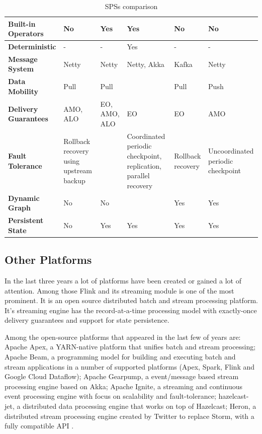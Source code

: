 \documentclass[ppgc,diss,english]{iiufrgs}
\begin{document}
\begin{table}[t]
\begin{center}
\begin{tabular}{ | p{2.5cm} | p{2cm} | p{2.5cm} | p{2.5cm} | p{2cm} | p{2cm} |}
        \textbf{Built-in Operators}      & No & Yes & Yes & No & No \\\hline
        \textbf{Deterministic}           & - & - & Yes & - & - \\\hline
        
        \textbf{Message System}          & Netty & Netty & Netty, Akka & Kafka & Netty \\\hline
        \textbf{Data Mobility}\cite{kamburugamuvesurvey}          & Pull & Pull &  & Pull & Push \\\hline
        \textbf{Delivery Guarantees}\cite{bockermann2014survey}    & AMO, ALO & EO, AMO, ALO & EO & EO & AMO \\\hline
        \textbf{Fault Tolerance}\cite{gradvohl2014comparing}         & Rollback recovery using upstream backup &  & Coordinated periodic checkpoint, replication, parallel recovery & Rollback recovery \cite{kamburugamuvesurvey}  & Uncoordinated periodic checkpoint \\\hline
        \textbf{Dynamic Graph}           & No & No &  & Yes & Yes \\\hline
        \textbf{Persistent State}        & No & Yes & Yes & Yes & Yes \\\hline
        
	\end{tabular}
	\begin{flushleft}
	\end{flushleft}
	\caption{SPSs comparison}
	\label{table:sps_comparison}
\end{center}
\end{table}

\subsection{Other Platforms}

In the last three years a lot of platforms have been created or gained a lot of attention. Among those Flink and its streaming module is one of the most prominent. It is an open source distributed batch and stream processing platform. It's streaming engine has the record-at-a-time processing model with exactly-once delivery guarantees and support for state persistence.

Among the open-source platforms that appeared in the last few of years are: Apache Apex, a YARN-native platform that unifies batch and stream processing; Apache Beam, a programming model for building and executing batch and stream applications in a number of supported platforms (Apex, Spark, Flink and Google Cloud Dataflow); Apache Gearpump, a event/message based stream processing engine based on Akka; Apache Ignite, a streaming and continuous event processing engine with focus on scalability and fault-tolerance; hazelcast-jet, a distributed data processing engine that works on top of Hazelcast; Heron, a distributed stream processing engine created by Twitter to replace Storm, with a fully compatible API \cite{wingerath2016real}.
\end{document}
